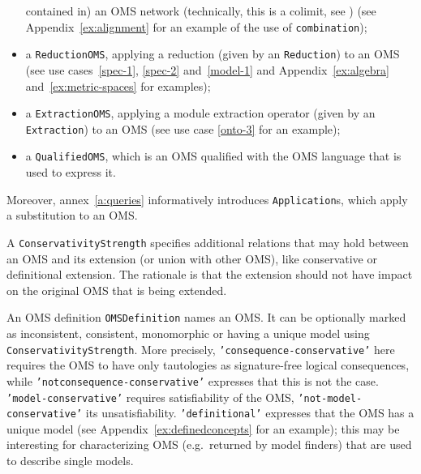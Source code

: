 \documentclass[10pt, a4paper]{isov2}
\newcommand*{\syntax}[1]{\texttt{#1}}
\begin{document}
\begin{itemize}
  contained in) an OMS network (technically, this is a colimit, see
  \cite{ZimmermanEtAl06}) 
  (see Appendix~\ref{ex:alignment} for an example of the use of \syntax{combination});
\item a \syntax{ReductionOMS}, applying a reduction
(given by an \syntax{Reduction}) to an OMS (see use cases~\ref{spec-1}, \ref{spec-2} and~\ref{model-1} and Appendix~\ref{ex:algebra} and~\ref{ex:metric-spaces} for examples);
\item a \syntax{ExtractionOMS}, applying a module extraction operator
(given by an \syntax{Extraction}) to an OMS
 (see use case \ref{onto-3} for an example);
\item a \syntax{QualifiedOMS}, which is an OMS qualified with the OMS
  language that is used to express it.
\end{itemize}
Moreover, annex~\ref{a:queries}
informatively introduces \syntax{Application}s, which apply a substitution
to an OMS.

A \syntax{ConservativityStrength} specifies additional relations that
may hold between an OMS and its extension (or union with other OMS),
like conservative or definitional extension. The rationale is that the
extension should not have impact on the original OMS that is being
extended. 

An OMS definition \syntax{OMSDefinition} names an OMS.  It can be
optionally marked as inconsistent, consistent, monomorphic or having a
unique model using \syntax{ConservativityStrength}. More precisely,
\syntax{'consequence-conservative'} here requires the OMS to have only
tautologies as signature-free logical consequences, while
\syntax{'not\-consequence-conservative'} expresses that this is not
the case.  \syntax{'model-conservative'} requires satisfiability of
the OMS, \syntax{'not-model-conservative'} its unsatisfiability.
\syntax{'de\-fi\-nitional'} expresses that the OMS has a unique
model (see Appendix~\ref{ex:definedconcepts} for an example); this may be interesting for characterizing OMS
(e.g.\ returned by model finders) that are used to describe single
models.
\end{document}
